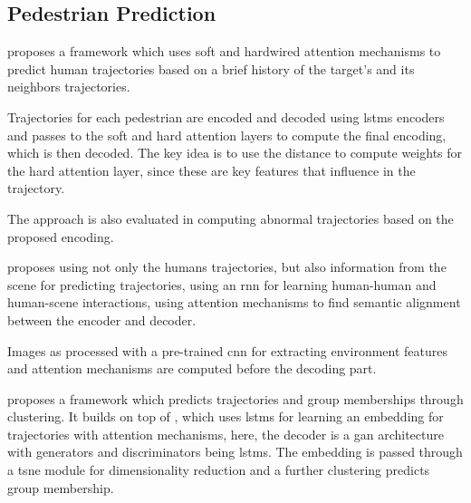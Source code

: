 \subsection{Pedestrian Prediction}\label{subsec: pedestrian prediction}


\cite{fernando2018soft+} proposes a framework which uses soft and hardwired attention mechanisms to predict human trajectories based on a brief history of the target's and its neighbors trajectories.

Trajectories for each pedestrian are encoded and decoded using \glspl{lstm} encoders and passes to the soft and hard attention layers to compute the final encoding, which is then decoded.
%
The key idea is to use the distance to compute weights for the hard attention layer, since these are key features that influence in the trajectory.

The approach is also evaluated in computing abnormal trajectories based on the proposed encoding.


\cite{bhujel2019pedestrian} proposes using not only the humans trajectories, but also information from the scene for predicting trajectories, using an \gls{rnn} for learning human-human and human-scene interactions, using attention mechanisms to find semantic alignment between the encoder and decoder.

Images as processed with a pre-trained \gls{cnn} for extracting environment features and attention mechanisms are computed before the decoding part.



\cite{fernando2019gd} proposes a framework which predicts trajectories and group memberships through clustering.
%
It builds on top of \cite{fernando2018soft+}, which uses \glspl{lstm} for learning an embedding for trajectories with attention mechanisms, here, the decoder is a \gls{gan} architecture with generators and discriminators being \glspl{lstm}.
%
The embedding is passed through a \gls{tsne} module for dimensionality reduction and a further clustering predicts group membership. 

